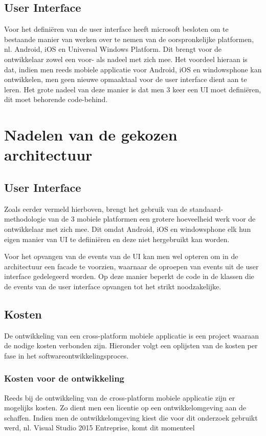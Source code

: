 \subsection{User Interface}
Voor het definiëren van de user interface heeft microsoft besloten om te bestaande manier van werken over te nemen van de oorspronkelijke platformen, nl. Android, iOS en Universal Windows Platform.
Dit brengt voor de ontwikkelaar zowel een voor- als nadeel met zich mee. Het voordeel hieraan is dat, indien men reeds mobiele applicatie voor Android, iOS en windowsphone kan ontwikkelen, men geen
nieuwe opmaaktaal voor de user interface dient aan te leren. Het grote nadeel van deze manier is dat men 3 keer een UI moet definiëren,
dit moet behorende code-behind.

\label{sec:nadelenvandegekozenapparchitectuur}
\section{Nadelen van de gekozen architectuur}
\subsection{User Interface}
Zoals eerder vermeld hierboven, brengt het gebruik van de standaard-methodologie van de 3 mobiele platformen een grotere hoeveelheid
werk voor de ontwikkelaar met zich mee. Dit omdat Android, iOS en windowsphone elk hun eigen manier van UI te defiiniëren en deze niet hergebruikt kan worden.

Voor het opvangen van de events van de UI kan men wel opteren om in de architectuur een facade te voorzien, waarnaar de oproepen van events uit de user interface gedelegeerd worden.
Op deze manier beperkt de code in de klassen die de events van de user interface opvangen tot het strikt noodzakelijke.
\label{sec:appkosten}
\subsection{Kosten}
De ontwikkeling van een cross-platform mobiele applicatie is een project waaraan de nodige kosten verbonden zijn.
Hieronder volgt een oplijsten van de kosten per fase in het softwareontwikkelingsproces.

\subsubsection{Kosten voor de ontwikkeling}
Reeds bij de ontwikkeling van de cross-platform mobiele applicatie zijn er mogelijks kosten. Zo dient men een licentie op een ontwikkelomgeving
aan de schaffen. Indien men de ontwikkelomgeving kiest die voor dit onderzoek gebruikt werd, nl. Visual Studio 2015 Entreprise, komt dit momenteel

